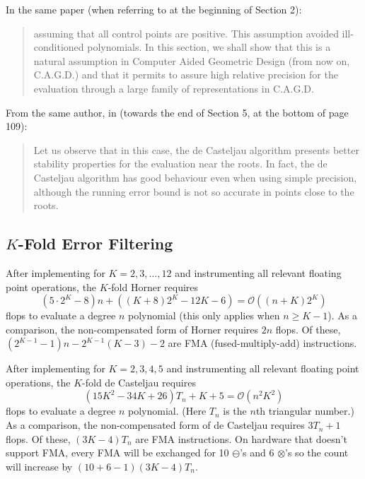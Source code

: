 \documentclass[letterpaper,10pt]{article}
\begin{document}
\noindent In the same paper (when referring to \cite{Bezerra2013} at the
beginning of Section 2):

\begin{quote}
  assuming that all control points are positive. This assumption avoided
  ill-conditioned polynomials. In this section, we shall show that this is
  a natural assumption in Computer Aided Geometric Design (from now on,
  C.A.G.D.) and that it permits to assure high relative precision for the
  evaluation through a large family of representations in C.A.G.D.
\end{quote}

\noindent From the same author, in \cite{Mainar2005} (towards the
end of Section 5, at the bottom of page 109):

\begin{quote}
  Let us observe that in this case, the de Casteljau algorithm presents
  better stability properties for the evaluation near the roots. In fact,
  the de Casteljau algorithm has good behaviour even when using simple
  precision, although the running error bound is not so accurate in points
  close to the roots.
\end{quote}

\subsection{\texorpdfstring{\(K\)}{K}-Fold Error Filtering}

After implementing for \(K = 2, 3, \ldots, 12\) and instrumenting all
relevant floating point operations, the \(K\)-fold Horner requires
\[(5 \cdot 2^K - 8)n + \left((K + 8) 2^K - 12K - 6\right) =
\mathcal{O}\left((n + K)2^K\right)\]
flops to evaluate a degree \(n\) polynomial (this only applies when
\(n \geq K - 1\)). As a comparison, the
non-compensated form of Horner requires \(2n\) flops. Of these,
\(\left(2^{K - 1} - 1\right)n - 2^{K - 1}(K - 3) - 2\) are
FMA (fused-multiply-add) instructions.

After implementing for \(K = 2, 3, 4, 5\) and instrumenting all relevant
floating point operations, the \(K\)-fold de Casteljau requires
\[(15K^2 - 34K + 26)T_n + K + 5 =
\mathcal{O}\left(n^2 K^2\right)\]
flops to evaluate a degree \(n\) polynomial. (Here \(T_n\) is the
\(n\)th triangular number.) As a comparison, the non-compensated form of
de Casteljau requires \(3 T_n + 1\) flops. Of these, \((3K - 4)T_n\) are
FMA instructions. On hardware that doesn't support FMA,
every FMA will be exchanged for 10 \(\ominus\)'s and 6 \(\otimes\)'s so the
count will increase by \((10 + 6 - 1)(3K - 4)T_n\).
\end{document}
